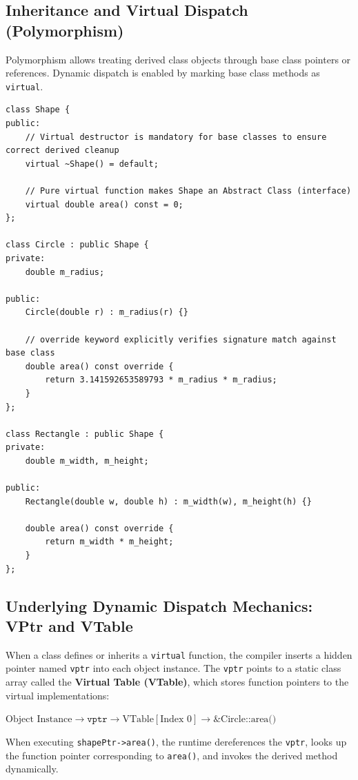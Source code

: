 \documentclass[10pt,journal,compsoc,onecolumn]{IEEEtran}
\begin{document}
\subsection{Inheritance and Virtual Dispatch (Polymorphism)}
Polymorphism allows treating derived class objects through base class pointers or references. Dynamic dispatch is enabled by marking base class methods as \texttt{virtual}.

\begin{verbatim}
class Shape {
public:
    // Virtual destructor is mandatory for base classes to ensure correct derived cleanup
    virtual ~Shape() = default;

    // Pure virtual function makes Shape an Abstract Class (interface)
    virtual double area() const = 0; 
};

class Circle : public Shape {
private:
    double m_radius;

public:
    Circle(double r) : m_radius(r) {}

    // override keyword explicitly verifies signature match against base class
    double area() const override {
        return 3.141592653589793 * m_radius * m_radius;
    }
};

class Rectangle : public Shape {
private:
    double m_width, m_height;

public:
    Rectangle(double w, double h) : m_width(w), m_height(h) {}

    double area() const override {
        return m_width * m_height;
    }
};
\end{verbatim}

\subsection{Underlying Dynamic Dispatch Mechanics: VPtr and VTable}
When a class defines or inherits a \texttt{virtual} function, the compiler inserts a hidden pointer named \texttt{vptr} into each object instance. The \texttt{vptr} points to a static class array called the \textbf{Virtual Table (VTable)}, which stores function pointers to the virtual implementations:

$\text{Object Instance} \longrightarrow \texttt{vptr} \longrightarrow \text{VTable} \left[ \text{Index 0} \right] \longrightarrow \text{\&Circle::area()}$

When executing \texttt{shapePtr->area()}, the runtime dereferences the \texttt{vptr}, looks up the function pointer corresponding to \texttt{area()}, and invokes the derived method dynamically.
\end{document}
